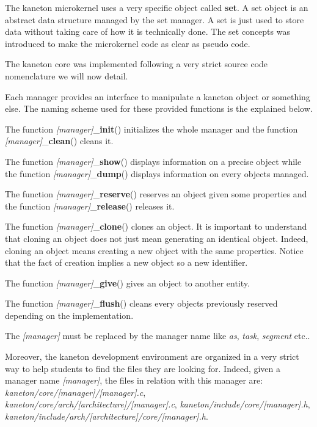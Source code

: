 The kaneton microkernel uses a very specific object called \textbf{set}.
A set object is an abstract data structure managed by the set manager.
A set is just used to store data without taking care of how it is technically
done. The set concepts was introduced to make the microkernel code as
clear as pseudo code.

The kaneton core was implemented following a very strict source code
nomenclature we will now detail.

Each manager provides an interface to manipulate a kaneton object or
something else. The naming scheme used for these provided functions
is the explained below.

The function \textit{[manager]}\_\textbf{init}() initializes the whole
manager and the function \textit{[manager]}\_\textbf{clean}() cleans it.

The function \textit{[manager]}\_\textbf{show}() displays information
on a precise object while the function \textit{[manager]}\_\textbf{dump}()
displays information on every objects managed.

The function \textit{[manager]}\_\textbf{reserve}() reserves an object
given some properties and the function \textit{[manager]}\_\textbf{release}()
releases it.

The function \textit{[manager]}\_\textbf{clone}() clones an object. It is
important to understand that cloning an object does not just mean
generating an identical object. Indeed, cloning an object means creating
a new object with the same properties. Notice that the fact of creation
implies a new object so a new identifier.

The function \textit{[manager]}\_\textbf{give}() gives an object to another
entity.

The function \textit{[manager]}\_\textbf{flush}() cleans every objects
previously reserved depending on the implementation.

The \textit{[manager]} must be replaced by the manager name like \textit{as},
\textit{task}, \textit{segment} etc..

Moreover, the kaneton development environment are organized in a very
strict way to help students to find the files they are looking for. Indeed,
given a manager name \textit{[manager]}, the files in relation with this
manager are: \textit{kaneton/core/[manager]/[manager].c}, 
\textit{kaneton/core/arch/[architecture]/[manager].c}, 
\textit{kaneton/include/core/[manager].h}, 
\textit{kaneton/include/arch/[architecture]/core/[manager].h}.

